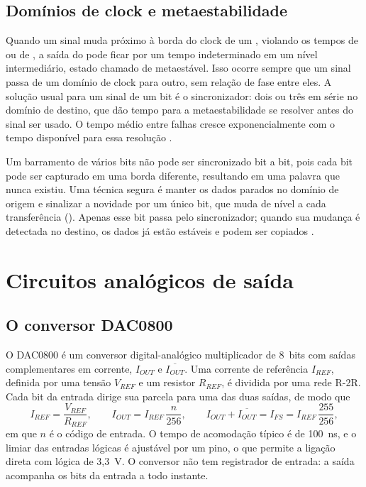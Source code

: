 \subsection{Domínios de clock e metaestabilidade}\label{sec:cdc}

Quando um sinal muda próximo à borda do clock de um , violando os tempos de  ou de , a saída do  pode ficar por um tempo indeterminado em um nível intermediário, estado chamado de metaestável. Isso ocorre sempre que um sinal passa de um domínio de clock para outro, sem relação de fase entre eles. A solução usual para um sinal de um bit é o sincronizador: dois ou três  em série no domínio de destino, que dão tempo para a metaestabilidade se resolver antes do sinal ser usado. O tempo médio entre falhas cresce exponencialmente com o tempo disponível para essa resolução \cite{ginosar2011}.

Um barramento de vários bits não pode ser sincronizado bit a bit, pois cada bit pode ser capturado em uma borda diferente, resultando em uma palavra que nunca existiu. Uma técnica segura é manter os dados parados no domínio de origem e sinalizar a novidade por um único bit, que muda de nível a cada transferência (). Apenas esse bit passa pelo sincronizador; quando sua mudança é detectada no destino, os dados já estão estáveis e podem ser copiados \cites{cummings2008,ginosar2011}.

\section{Circuitos analógicos de saída}

\subsection{O conversor DAC0800}

O DAC0800 é um conversor digital-analógico multiplicador de 8~bits com saídas complementares em corrente, \(I_{OUT}\) e \(\overline{I_{OUT}}\). Uma corrente de referência \(I_{REF}\), definida por uma tensão \(V_{REF}\) e um resistor \(R_{REF}\), é dividida por uma rede R-2R. Cada bit da entrada dirige sua parcela para uma das duas saídas, de modo que \cite{ti2013}
\begin{equation}\label{eq:dac0800}
	I_{REF} = \frac{V_{REF}}{R_{REF}}, \qquad I_{OUT} = I_{REF}\,\frac{n}{256}, \qquad I_{OUT} + \overline{I_{OUT}} = I_{FS} = I_{REF}\,\frac{255}{256},
\end{equation}
em que \(n\) é o código de entrada. O tempo de acomodação típico é de 100~ns, e o limiar das entradas lógicas é ajustável por um pino, o que permite a ligação direta com lógica de 3,3~V. O conversor não tem registrador de entrada: a saída acompanha os bits da entrada a todo instante.

